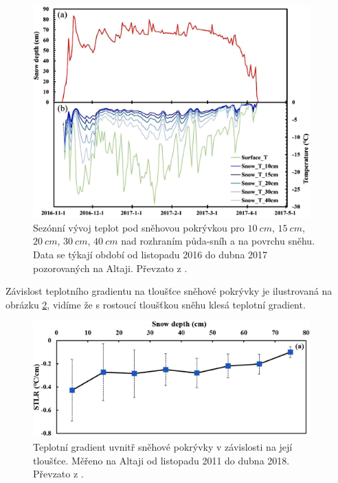 \begin{figure}
	\centering
	\includegraphics[width=0.95\textwidth]{img/ch1/snowtempaltai.png}
	\caption{Sezónní vývoj teplot pod sněhovou pokrývkou pro $\SI{10}{cm}$, $\SI{15}{cm}$, $\SI{20}{cm}$, $\SI{30}{cm}$, $\SI{40}{cm}$ nad rozhraním půda-sníh a na povrchu sněhu. Data se týkají období od listopadu 2016 do dubna 2017 pozorovaných na Altaji. Převzato z \cite{zhangwei2021}.}
	\label{fig:snowtempaltai}
\end{figure}

Závislost teplotního gradientu na tloušťce sněhové pokrývky je ilustrovaná na obrázku \ref{fig:snowlapserate}, vidíme že s rostoucí tloušťkou sněhu klesá teplotní gradient.

\begin{figure}
	\centering
	\includegraphics[width=0.95\textwidth]{img/ch1/snowlapserate.png}
	\caption{Teplotní gradient uvnitř sněhové pokrývky v závislosti na její tloušťce. Měřeno na Altaji od listopadu 2011 do dubna 2018. Převzato z \cite{zhangwei2021}.}
	\label{fig:snowlapserate}
\end{figure}

